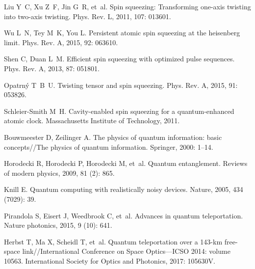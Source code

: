 \begin{thebibliography}{113}
	Liu Y~C, Xu Z~F, Jin G~R, et~al.
	\newblock Spin squeezing: Transforming one-axis twisting into two-axis
	twisting\allowbreak[J].
	\newblock Phys. Rev. L, 2011, 107: 013601.
	
	Wu L~N, Tey M~K, You L.
	\newblock Persistent atomic spin squeezing at the heisenberg
	limit\allowbreak[J].
	\newblock Phys. Rev. A, 2015, 92: 063610.
	
	Shen C, Duan L~M.
	\newblock Efficient spin squeezing with optimized pulse
	sequences\allowbreak[J].
	\newblock Phys. Rev. A, 2013, 87: 051801.
	
	Opatrn\'y T~B~U.
	\newblock Twisting tensor and spin squeezing\allowbreak[J].
	\newblock Phys. Rev. A, 2015, 91: 053826.
	
	Schleier-Smith M~H.
	\newblock Cavity-enabled spin squeezing for a quantum-enhanced atomic
	clock\allowbreak[D]. Massachusetts Institute of Technology, 2011.
	
	Bouwmeester D, Zeilinger A.
	\newblock The physics of quantum information: basic
	concepts\allowbreak[M]//\allowbreak{}The physics of quantum information. Springer, 2000: 1--14.
	
	Horodecki R, Horodecki P, Horodecki M, et~al.
	\newblock Quantum entanglement\allowbreak[J].
	\newblock Reviews of modern physics, 2009, 81 (2): 865.
	
	Knill E.
	\newblock Quantum computing with realistically noisy devices\allowbreak[J].
	\newblock Nature, 2005, 434 (7029): 39.
	
	Pirandola S, Eisert J, Weedbrook C, et~al.
	\newblock Advances in quantum teleportation\allowbreak[J].
	\newblock Nature photonics, 2015, 9 (10): 641.
	
	Herbst T, Ma X, Scheidl T, et~al.
	\newblock Quantum teleportation over a 143-km free-space
	link\allowbreak[C]//\allowbreak{}International Conference on Space
	Optics—ICSO 2014: volume 10563. International Society for Optics and Photonics, 2017:
	105630V.
	

\end{thebibliography}
